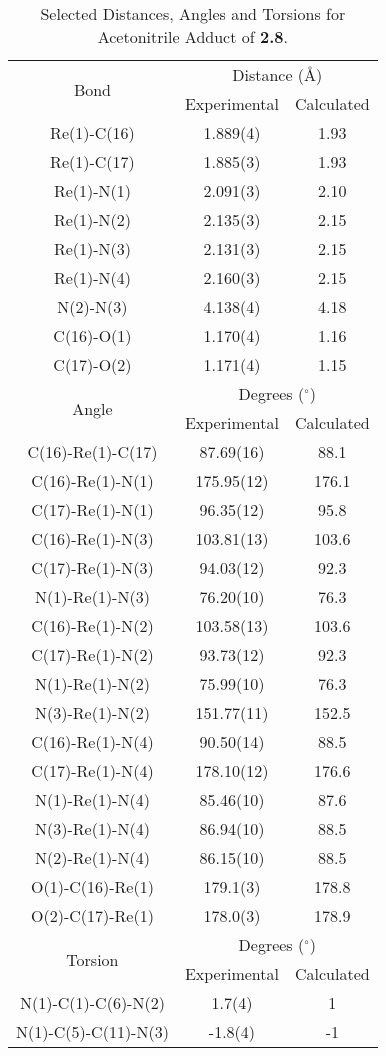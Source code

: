 \begin{table}[htb]
  \centering
  \caption{Selected Distances, Angles and Torsions for Acetonitrile Adduct of \textbf{2.8}.}
    \begin{tabular}{ccc}
    \toprule
	\multirow{2}{*}{Bond} & \multicolumn{2}{c}{Distance (\r{A})} \\ \cline{2-3}
     & Experimental & Calculated \\ \midrule
    Re(1)-C(16) & 1.889(4) & 1.93 \\
    Re(1)-C(17) & 1.885(3) & 1.93 \\
    Re(1)-N(1) & 2.091(3) & 2.10 \\
    Re(1)-N(2) & 2.135(3) & 2.15 \\
    Re(1)-N(3) & 2.131(3) & 2.15 \\
    Re(1)-N(4) & 2.160(3) & 2.15 \\ 
    N(2)-N(3) & 4.138(4) & 4.18 \\ 
    C(16)-O(1) & 1.170(4) & 1.16 \\
    C(17)-O(2) & 1.171(4) & 1.15 \\ \midrule
	\multirow{2}{*}{Angle} & \multicolumn{2}{c}{Degrees ($^\circ$)} \\ \cline{2-3}
     & Experimental & Calculated \\ \midrule
    C(16)-Re(1)-C(17) & 87.69(16) & 88.1 \\
    C(16)-Re(1)-N(1) & 175.95(12) & 176.1 \\
    C(17)-Re(1)-N(1) & 96.35(12) & 95.8 \\
    C(16)-Re(1)-N(3) & 103.81(13) & 103.6 \\
    C(17)-Re(1)-N(3) & 94.03(12) & 92.3 \\
    N(1)-Re(1)-N(3) & 76.20(10) & 76.3 \\
    C(16)-Re(1)-N(2) & 103.58(13) & 103.6 \\
    C(17)-Re(1)-N(2) & 93.73(12) & 92.3 \\
    N(1)-Re(1)-N(2) & 75.99(10) & 76.3 \\
    N(3)-Re(1)-N(2) & 151.77(11) & 152.5 \\
    C(16)-Re(1)-N(4) & 90.50(14) & 88.5 \\
    C(17)-Re(1)-N(4) & 178.10(12) & 176.6 \\
    N(1)-Re(1)-N(4) & 85.46(10) & 87.6 \\
    N(3)-Re(1)-N(4) & 86.94(10) & 88.5 \\
    N(2)-Re(1)-N(4) & 86.15(10) & 88.5 \\
    O(1)-C(16)-Re(1) & 179.1(3) & 178.8 \\
    O(2)-C(17)-Re(1) & 178.0(3) & 178.9 \\\midrule
    \multirow{2}{*}{Torsion} & \multicolumn{2}{c}{Degrees ($^\circ$)} \\ \cline{2-3}
     & Experimental & Calculated \\ \midrule
    N(1)-C(1)-C(6)-N(2) & 1.7(4) & 1 \\
    N(1)-C(5)-C(11)-N(3) & -1.8(4) & -1 \\
    \bottomrule
    \end{tabular}%
  \label{tab.da8}%
\end{table}%
